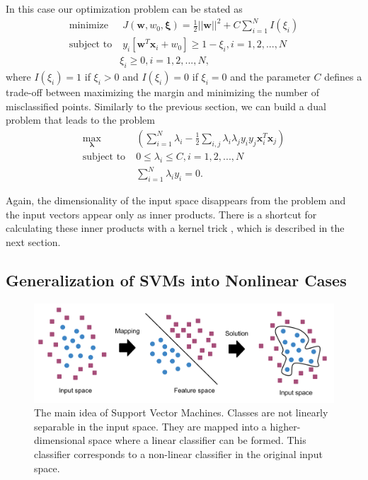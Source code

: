 In this case our optimization problem can be stated as
\begin{align}
\text{minimize} &\; J(\mathbf{w}, w_0, \mathbf{\xi}) = \frac{1}{2} ||\mathbf{w}||^2 + C \sum_{i=1}^N I(\xi_i) \label{eq:SVM_C_parameter} \\
\text{subject to} &\; y_i [\mathbf{w}^T \mathbf{x}_i + w_0] \ge 1 - \xi_i, i = 1, 2, ..., N \\
& \xi_i \ge 0, i = 1, 2, ..., N,
\end{align}
where $I(\xi_i) = 1$ if $\xi_i > 0$ and $I(\xi_i) = 0$ if $\xi_i = 0$ and the parameter $C$ defines a trade-off between maximizing the margin and minimizing the number of misclassified points. Similarly to the previous section, we can build a dual problem that leads to the problem
\begin{align}
\underset{\mathbf{\lambda}}{\operatorname{max}} &\; \left ( \sum_{i=1}^N \lambda_i - \frac{1}{2} \sum_{i,j} \lambda_i \lambda_j y_i y_j \mathbf{x}_i^T \mathbf{x}_j \right ) \\
\text{subject to} &\; 0 \le \lambda_i \le C, i = 1, 2, ..., N \\
&\; \sum_{i=1}^N \lambda_i y_i = 0.
\end{align}

Again, the dimensionality of the input space disappears from the problem and the input vectors appear only as inner products. There is a shortcut for calculating these inner products with a kernel trick \cite{Jordan04}, which is described in the next section.

\subsection{Generalization of SVMs into Nonlinear Cases}
\begin{figure}[here]
\centering
\includegraphics[scale=0.7]{images/svm_mapping.pdf}
\caption{The main idea of Support Vector Machines. Classes are not linearly separable in the input space. They are mapped into a higher-dimensional space where a linear classifier can be formed. This classifier corresponds to a non-linear classifier in the original input space.}
\label{fig:svm_mapping}
\end{figure}


